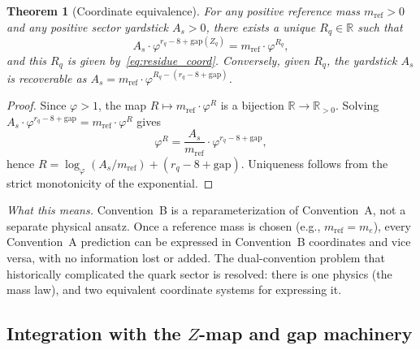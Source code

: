 \documentclass[11pt,a4paper]{article}
\newtheorem{theorem}{Theorem}[section]
\theoremstyle{definition}
\theoremstyle{remark}
\newcommand{\phig}{\varphi}
\newcommand{\Zidx}{Z}
\begin{document}
\begin{theorem}[Coordinate equivalence]
\label{thm:coord_equiv}
For any positive reference mass $m_{\mathrm{ref}} > 0$ and any positive
sector yardstick $A_s > 0$, there exists a unique $R_q \in \mathbb{R}$
such that
\begin{equation}
  A_s \cdot \phig^{r_q - 8 + \mathrm{gap}(\Zidx_q)}
  = m_{\mathrm{ref}} \cdot \phig^{R_q},
  \label{eq:coord_equiv}
\end{equation}
and this $R_q$ is given by~\eqref{eq:residue_coord}.
Conversely, given $R_q$, the yardstick $A_s$ is recoverable as
$A_s = m_{\mathrm{ref}} \cdot \phig^{R_q - (r_q - 8 + \mathrm{gap})}$.
\end{theorem}

\begin{proof}
Since $\phig > 1$, the map $R \mapsto m_{\mathrm{ref}} \cdot \phig^R$ is
a bijection $\mathbb{R} \to \mathbb{R}_{>0}$.  Solving
$A_s \cdot \phig^{r_q - 8 + \mathrm{gap}} = m_{\mathrm{ref}} \cdot \phig^R$
gives
\[
  \phig^R = \frac{A_s}{m_{\mathrm{ref}}} \cdot \phig^{r_q - 8 + \mathrm{gap}},
\]
hence $R = \log_\phig(A_s / m_{\mathrm{ref}}) + (r_q - 8 + \mathrm{gap})$.
Uniqueness follows from the strict monotonicity of the exponential.
\end{proof}

\noindent\textit{What this means.}\quad
Convention~B is a reparameterization of Convention~A, not a separate physical
ansatz.  Once a reference mass is chosen (e.g., $m_{\mathrm{ref}} = m_e$),
every Convention~A prediction can be expressed in Convention~B coordinates and
vice versa, with no information lost or added.  The dual-convention problem
that historically complicated the quark sector is resolved: there is one
physics (the mass law), and two equivalent coordinate systems for expressing
it.

\subsection{Integration with the $\Zidx$-map and gap machinery}
\end{document}

